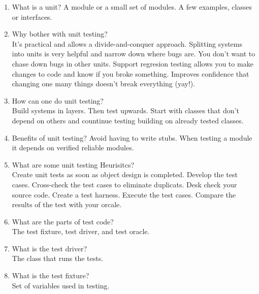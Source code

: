 \documentclass[10pt]{article}
\begin{document}
\begin{enumerate}
    \item What is a unit?
          A module or a small set of modules. A few examples, classes or interfaces.\\

    \item Why bother with unit testing?\\
          It's practical and allows a divide-and-conquer approach. Splitting systems into units is very helpful and narrow down where bugs are. You don't want to chase down bugs in other units. Support regresion testing
          allows you to make changes to code and know if you broke something. Improves confidence that changing one many things doesn't break everything (yay!).\\

    \item How can one do unit testing?\\
          Build systems in layers. Then test upwards. Start with classes that don't depend on others and countinue testing building on already tested classes.

    \item Benefits of unit testing?
          Avoid having to write stubs. When testing a module it depends on verified reliable modules.\\

    \item What are some unit testing Heurisitcs?\\
          Create unit tests as soon as object design is completed. Develop the test cases. Cross-check the test cases to eliminate duplicats. Desk check your source code. Create a test harness. Execute the test cases. Compare the results
          of the test with your orcale.\\

    \item What are the parts of test code?
          \\ The test fixture, test driver, and test oracle.\\
    \item What is the test driver?\\
          The class that runs the tests.\\

    \item What is the test fixture?\\
          Set of variables used in testing.\\


\end{enumerate}
\end{document}
